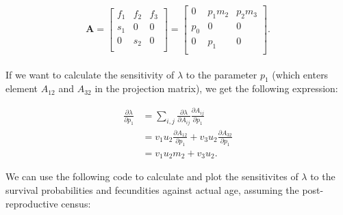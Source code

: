 \documentclass[
]{book}
\begin{document}
\begin{align}
\begin{split}
\mathbf{A}=\left[\begin{matrix} f_1 & f_2 &f_3  \\ s_1 &0&0\\ 0 & s_2 &0  \\  \end{matrix}\right]=\left[\begin{matrix} 0 & p_1m_2 &p_2m_3  \\ p_0 &0&0\\ 0 & p_1 &0  \\  \end{matrix}\right].
\end{split}
\end{align}

If we want to calculate the sensitivity of \(\lambda\) to the parameter \(p_1\) (which enters element \(A_{12}\) and \(A_{32}\) in the projection matrix), we get the following expression:

\begin{align}
\frac{\partial \lambda}{\partial p_1}&=\sum_{i,j} \frac{\partial \lambda}{\partial A_{ij}} \frac{\partial A_{ij}}{\partial p_1}\\
&= v_1u_2 \frac{\partial A_{12}}{\partial p_1}+ v_3u_2 \frac{\partial A_{32}}{\partial p_1}\\
&= v_1u_2 m_2+ v_3u_2. 
\end{align}

We can use the following code to calculate and plot the sensitivites of \(\lambda\) to the survival probabilities and fecundities against actual age, assuming the post-reproductive census:
\end{document}
